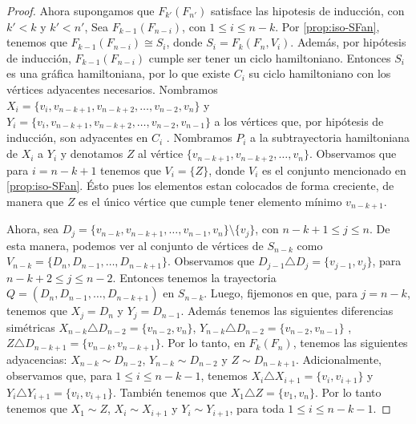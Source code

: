 \begin{proof}
            Ahora supongamos que $F_{k'}(F_{n'})$ satisface las hipotesis de
            inducci\'on, con $k'< k$ y $k'<n'$, 
            Sea $F_{k-1}(F_{n-i})$, con $1 \leq i \leq n-k$. Por
            \cref{prop:iso-SFan}, tenemos que $F_{k-1}(F_{n-i}) \cong S_i$,
            donde $S_i= F_k(F_n, V_i)$. Adem\'as, por hip\'otesis de
            inducci\'on, $F_{k-1}(F_{n-i})$ cumple ser tener un ciclo
            hamiltoniano. Entonces $S_i$ es una gr\'afica hamiltoniana, por lo
            que existe $C_i$ su ciclo hamiltoniano con los v\'ertices adyacentes
            necesarios. Nombramos $X_i = \{v_i, v_{n-k+1}, v_{n-k+2}, \dots,
            v_{n-2}, v_n\}$ y $Y_i= \{v_i, v_{n-k+1}, v_{n-k+2}, \dots, v_{n-2},
            v_{n-1}\}$ a los v\'ertices que, por hip\'otesis de inducci\'on, son
            adyacentes en $C_i$ . Nombramos $P_i$ a la subtrayectoria
            hamiltoniana de $X_i$ a $Y_i$ y denotamos $Z$ al v\'ertice
            $\{v_{n-k+1}, v_{n-k+2}, \dots, v_n\}$. Observamos que para $i=
            n-k+1$ tenemos que $V_i = \{Z\}$, donde $V_i$ es el conjunto
            mencionado en \cref{prop:iso-SFan}. \'Esto pues los elementos estan
            colocados de forma creciente, de manera que $Z$ es el \'unico
            v\'ertice que cumple tener elemento m\'inimo $v_{n-k+1}$. 
    
            Ahora, sea $D_j =\{v_{n-k}, v_{n-k+1}, \dots, v_{n-1}, v_n\}
            \setminus \{v_j\}$, con $n-k+1 \leq j \leq n$.  De esta manera,
            podemos ver al conjunto de v\'ertices de $S_{n-k}$ como
            $V_{n-k}=\{D_n, D_{n-1}, \dots, D_{n-k+1}\}$. Observamos que
            $D_{j-1} \triangle D_j= \{v_{j-1}, v_j\}$, para $n-k+2 \leq j \leq
            n-2$. Entonces tenemos la trayectoria $Q= (D_n, D_{n-1}, \dots,
            D_{n-k+1})$ en $S_{n-k}$.     
            Luego, fijemonos en que, para $j= n-k$, tenemos que $X_j = D_n$ y
            $Y_j= D_{n-1}$. Adem\'as tenemos las siguientes diferencias
            sim\'etricas $X_{n-k}\triangle D_{n-2} =\{v_{n-2}, v_n\}$,
            $Y_{n-k}\triangle D_{n-2} =\{v_{n-2}, v_{n-1}\}$ , $Z\triangle
            D_{n-k+1} =\{v_{n-k}, v_{n-k+1}\}$. Por lo tanto, en $F_k(F_n)$,
            tenemos las siguientes adyacencias: $X_{n-k} \sim D_{n-2}$, $Y_{n-k}
            \sim D_{n-2}$ y $Z \sim D_{n-k+1}$. Adicionalmente, observamos que,
            para $1 \leq i \leq n- k- 1$, tenemos $X_{i} \triangle X_{i+1}=
            \{v_i, v_{i+1}\}$ y $Y_i \triangle Y_{i+1} = \{v_i, v_{i+1}\}$.
            Tambi\'en tenemos que $X_1 \triangle Z = \{v_1, v_n\}$. Por lo tanto
            tenemos que $X_1 \sim Z$, $X_i \sim X_{i+1}$ y $Y_i \sim Y_{i+1}$,
            para toda $1 \leq i \leq n-k-1$.
            

\end{proof}
